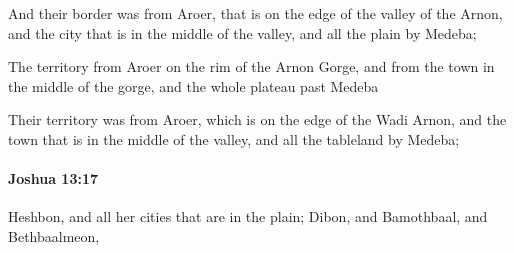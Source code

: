 			\begin{versebox}
					\item[BHS] 
					\item[ASV] And their border was from Aroer, that is on the edge of the valley of the Arnon, and the city that is in the middle of the valley, and all the plain by Medeba;
					\item[NIV] The territory from Aroer on the rim of the Arnon Gorge, and from the town in the middle of the gorge, and the whole plateau past Medeba
					\item[NRSV] Their territory was from Aroer, which is on the edge of the Wadi Arnon, and the town that is in the middle of the valley, and all the tableland by Medeba;
			\end{versebox}

		\paragraph{Joshua 13:17} %
			\label{JOSHUA-13-17}

			Heshbon, and all her cities that are in the plain; Dibon, and Bamothbaal, and Bethbaalmeon,

